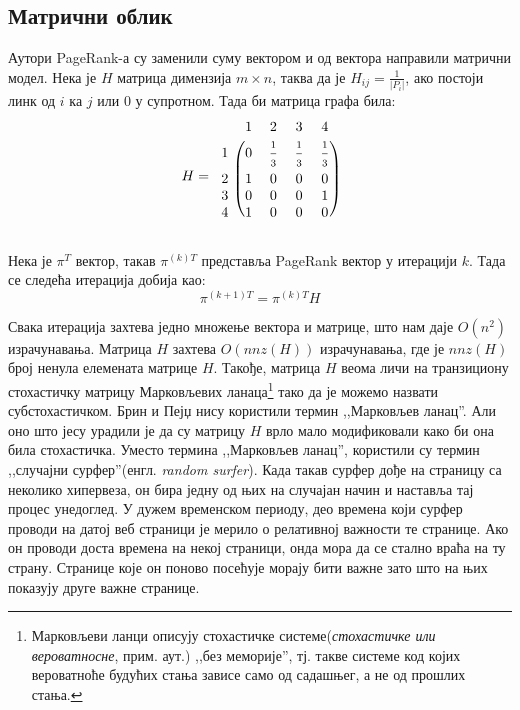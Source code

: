 \subsection{Матрични облик}
Аутори  PageRank-а су заменили суму вектором и од вектора направили матрични модел. Нека је $H$ матрица димензија $m\times n$, таква да је $H_{ij}=\frac{1}{\left |P_{i}  \right |}$, ако постоји линк од $i$ ка $j$ или $0$ у супротном. Тада би матрица графа била:
\[
H=
\begin{blockarray}{ccccc}
& 1 & 2 & 3 & 4  \\
\begin{block}{c(cccc)}
  1 & 0 & \frac{\strut 1}{\strut 3} & \frac{\strut 1}{\strut 3} & \frac{\strut 1}{\strut 3}  \\
  2 & 1 & 0 & 0 & 0  \\
  3 & 0 & 0 & 0 & 1  \\
  4 & 1 & 0 & 0 & 0  \\
\end{block}
\end{blockarray}
 \]

Нека је $\pi^{T}$ вектор, такав $\pi^{(k)T}$ представља PageRank вектор у итерацији $k$. Тада се следећа итерација добија као:
\begin{equation}
\pi^{(k+1) T}=\pi^{(k)T}H
\end{equation}

Свака итерација захтева једно множење вектора и матрице, што нам даје $O(n^{2})$
израчунавања. Матрица $H$ захтева $O(nnz(H))$ израчунавања, где је $nnz(H)$ број ненула елемената матрице $H$. Такође, матрица $H$ веома личи на транзициону стохастичку матрицу Марковљевих ланаца\footnote{Марковљеви ланци описују стохастичке системе(\emph{стохастичке или вероватносне}, прим. аут.) ,,без меморије'', тј. такве системе код којих вероватноће будућих стања зависе само од садашњег, а не од прошлих стања.\cite{filipovic2006operatori}} тако да је можемо назвати субстохастичком\cite[Ch 4.2]{langville2011google}. Брин и Пејџ нису користили термин ,,Марковљев ланац''. Али оно што јесу урадили је да су матрицу $H$ врло мало модификовали како би она била стохастичка. Уместо термина ,,Марковљев ланац'', користили су термин ,,случајни сурфер''(енгл. \emph{random surfer}). Када такав сурфер дође на страницу са неколико хипервеза, он бира једну од њих на случајан начин и наставља тај процес унедоглед. У дужем временском периоду, део времена који сурфер проводи на датој веб страници је мерило о релативној важности те странице. Ако он проводи доста времена на некој страници, онда мора да се стално враћа на ту страну. Странице које он поново посећује морају бити важне зато што на њих показују друге важне странице.

